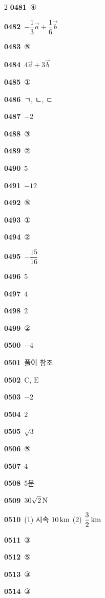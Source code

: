 \documentclass[10pt,a4paper]{article}
\newcommand{\pt}[1]{\mathrm{#1}}
\begin{document}
\begin{multicols}{2}
\noindent\textbf{0481}\ ④\par
\noindent\textbf{0482}\ $-\dfrac{1}{3}\vec{a}+\dfrac{1}{6}\vec{b}$\par
\noindent\textbf{0483}\ ⑤\par
\noindent\textbf{0484}\ $4\vec{a}+3\vec{b}$\par
\noindent\textbf{0485}\ ①\par
\noindent\textbf{0486}\ ㄱ, ㄴ, ㄷ\par
\noindent\textbf{0487}\ $-2$\par
\noindent\textbf{0488}\ ③\par
\noindent\textbf{0489}\ ②\par
\noindent\textbf{0490}\ $5$\par
\noindent\textbf{0491}\ $-12$\par
\noindent\textbf{0492}\ ⑤\par
\noindent\textbf{0493}\ ①\par
\noindent\textbf{0494}\ ②\par
\noindent\textbf{0495}\ $-\dfrac{15}{16}$\par
\noindent\textbf{0496}\ $5$\par
\noindent\textbf{0497}\ $4$\par
\noindent\textbf{0498}\ $2$\par
\noindent\textbf{0499}\ ②\par
\noindent\textbf{0500}\ $-4$\par
\noindent\textbf{0501}\ 풀이 참조\par
\noindent\textbf{0502}\ $\pt{C}$, $\pt{E}$\par
\noindent\textbf{0503}\ $-2$\par
\noindent\textbf{0504}\ $2$\par
\noindent\textbf{0505}\ $\sqrt{3}$\par
\noindent\textbf{0506}\ ⑤\par
\noindent\textbf{0507}\ $4$\par
\noindent\textbf{0508}\ $5$분\par
\noindent\textbf{0509}\ $30\sqrt{2}\mkern3mu \mathrm{N}$\par
\noindent\textbf{0510}\ (1) 시속 $10\mkern3mu \mathrm{km}$ (2) $\dfrac{3}{2}\mkern3mu \mathrm{km}$\par
\noindent\textbf{0511}\ ③\par
\noindent\textbf{0512}\ ⑤\par
\noindent\textbf{0513}\ ③\par
\noindent\textbf{0514}\ ③\par

\end{multicols}
\end{document}
